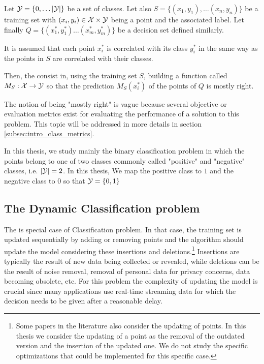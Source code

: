 \begin{definition} 
    Let $\mathcal{Y} = \{0, \dots |\mathcal{Y}|\}$ be a set of classes. Let also $S = \{(x_1, y_1), \dots (x_n, y_n)\}$ be a training set with $(x_i, y_i) \in \mathcal{X} \times \mathcal{Y}$ being a point and the associated label. Let finally $Q = \{(x^*_1, y^*_1) \dots (x^*_m, y^*_m)\}$ be a decision set defined similarly.
    
    It is assumed that each point $x^*_i$ is correlated with its class $y^*_i$ in the same way as the points in $S$ are correlated with their classes.

    Then, the  consist in, using the training set $S$, building a function called  $M_S : \mathcal{X} \rightarrow \mathcal{Y}$ so that the prediction $M_S(x^*_i)$ of the points of $Q$ is mostly right.
\end{definition}

The notion of being "mostly right" is vague because several objective or evaluation metrics exist for evaluating the performance of a solution to this problem. This topic will be addressed in more details in section \ref{subsec:intro_class_metrics}.

In this thesis, we study mainly the binary classification problem in which the points belong to one of two classes commonly called "positive" and "negative" classes, i.e. $|\mathcal{Y}| = 2$. In this thesis, We map the positive class to $1$ and the negative class to $0$ so that $\mathcal{Y} =  \{0, 1\}$ 

\subsection{The Dynamic Classification problem}\label{subsec:dynamic_intro}
The  is special case of Classification problem. In that case, the training set is updated sequentially by adding or removing points and the algorithm should update the model considering these insertions and deletions.\footnote{Some papers in the literature also consider the updating of points. In this thesis we consider the updating of a point as the removal of the outdated version and the insertion of the updated one. We do not study the specific optimizations that could be implemented for this specific case.} Insertions are typically the result of new data being collected or revealed, while deletions can be the result of noise removal, removal of personal data for privacy concerns,  data becoming obsolete, etc. For this problem the complexity of updating the model is crucial since many applications use real-time streaming data for which the decision needs to be given after a reasonable delay.

